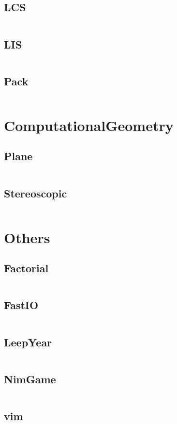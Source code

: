 \documentclass[a4paper,11pt]{article}
\begin{document}
\subsection{LCS}
\inputminted[breaklines]{c++}{05++DynamicProgramming/+LCS.cpp}
\subsection{LIS}
\inputminted[breaklines]{c++}{05++DynamicProgramming/+LIS.cpp}
\subsection{Pack}
\inputminted[breaklines]{c++}{05++DynamicProgramming/+Pack.cpp}

\newpage
\section{ComputationalGeometry}
\subsection{Plane}
\inputminted[breaklines]{c++}{06++ComputationalGeometry/+Plane.cpp}
\subsection{Stereoscopic}
\inputminted[breaklines]{c++}{06++ComputationalGeometry/+Stereoscopic.cpp}

\newpage
\section{Others}
\subsection{Factorial}
\inputminted[breaklines]{c++}{07++Others/+Factorial.cpp}
\subsection{FastIO}
\inputminted[breaklines]{c++}{07++Others/+FastIO.cpp}
\subsection{LeepYear}
\inputminted[breaklines]{c++}{07++Others/+LeepYear.cpp}
\subsection{NimGame}
\inputminted[breaklines]{c++}{07++Others/+NimGame.cpp}
\subsection{vim}
\inputminted[breaklines]{c++}{07++Others/+vim.vim}

\newpage
\end{document}
